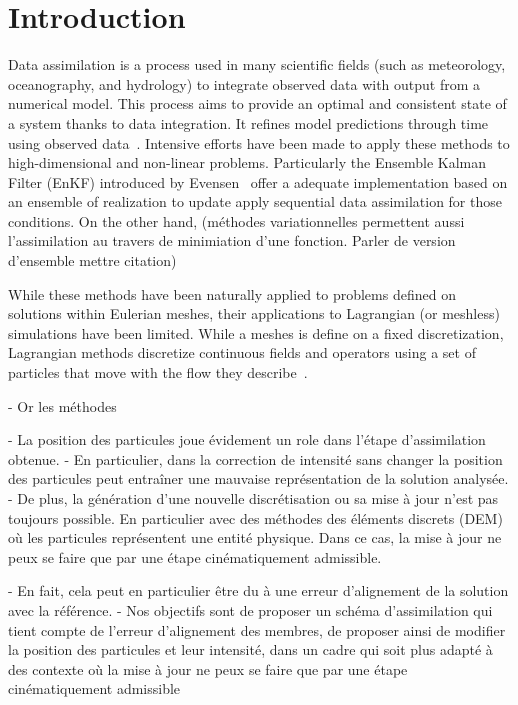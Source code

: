 
\section{Introduction}

Data assimilation is a process used in many scientific fields (such as meteorology, oceanography, and hydrology) to integrate observed data with output from a numerical model. This process aims to provide an optimal and consistent state of a system thanks to data integration. It refines model predictions through time using observed data~\cite{bocquet_introduction_2014}. Intensive efforts have been made to apply these methods to high-dimensional and non-linear problems. Particularly the Ensemble Kalman Filter (EnKF) introduced by Evensen~\cite{evensen_sequential_1994} offer a adequate implementation based on an ensemble of realization to update apply sequential data assimilation for those conditions. On the other hand, (méthodes variationnelles permettent aussi l'assimilation au travers de minimiation d'une fonction. Parler de version d'ensemble mettre citation)

While these methods have been naturally applied to problems defined on solutions within Eulerian meshes, their applications to Lagrangian (or meshless) simulations have been limited. While a meshes is define on a fixed discretization, Lagrangian methods discretize continuous fields and operators using a set of particles that move with the flow they describe~\cite{s_li_meshfree_2004}.

- Or les méthodes



- La position des particules joue évidement un role dans l'étape d'assimilation obtenue.
- En particulier, dans  la correction de intensité sans changer la position des particules peut entraîner une mauvaise représentation de la solution analysée.
- De plus, la génération d'une nouvelle discrétisation ou sa mise à jour n'est pas toujours possible. En particulier avec des méthodes des éléments discrets (DEM) où les particules représentent une entité physique. Dans ce cas, la mise à jour ne peux se faire que par une étape cinématiquement admissible.

- En fait, cela peut en particulier être du à une erreur d'alignement de la solution avec la référence.
- Nos objectifs sont de proposer un schéma d'assimilation qui tient compte de l’erreur d’alignement des membres, de proposer ainsi de modifier la position des particules et leur intensité, dans un cadre qui soit plus adapté à des contexte où la mise à jour ne peux se faire que par une étape cinématiquement admissible


